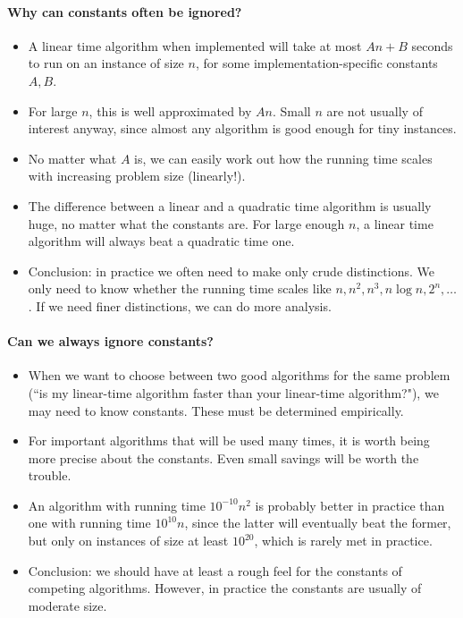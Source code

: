 \paragraph{Why can constants often be ignored?}
\begin{itemize}
\item A linear time algorithm when implemented will take at most $A
n + B$ seconds to run on an instance of size $n$, for some
implementation-specific constants $A, B$. 
\item For large $n$, this is well approximated by $A n$. 
Small $n$ are not usually of interest anyway, since almost any algorithm is good
 enough for tiny instances.
\item No matter what $A$ is, we can easily work out how the running time
scales with increasing problem size (linearly!). 
\item The difference between a linear and a quadratic time algorithm is
usually huge, no matter what the constants are. For large enough $n$, a
linear time algorithm will always beat a quadratic time one. 
\item Conclusion: in practice we often need to make only crude
distinctions. We only need to know whether the running time scales like 
$n, n^2, n^3, n \log n, 2^n, \dots$. If we need finer distinctions, we 
can do more analysis.
\end{itemize}



\paragraph{Can we always ignore constants?}
\begin{itemize}
\item When we want to choose between two good algorithms for the same
problem (``is my linear-time algorithm faster than your linear-time
algorithm?"), we may need to know constants. These must be determined
empirically. 
\item For important algorithms that will be used many times, it is worth
being more precise about the constants. Even small savings will be worth
the trouble. 
\item An algorithm with running time $10^{-10} n^2$ is probably better
in practice than one with running time $10^{10} n$, since the latter
will eventually beat the former, but only on instances of size at least $10^{20}$, 
which is rarely met in practice. 
\item Conclusion: we should have at least a rough feel for the constants
of competing algorithms. However, in practice the constants are usually
of moderate size. 
\end{itemize}



